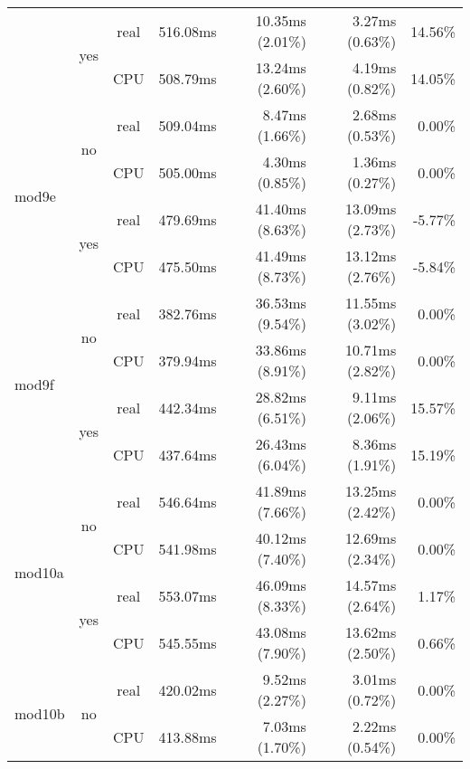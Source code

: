 \documentclass[en]{pracamgr}
\begin{document}
\begin{appendices}
\begin{small}
\begin{longtable}{|l|c|c|r|r|r|r|}
                          \cline{2-7}
                          & \multirow{2}{*}{yes} & real & 516.08ms & 10.35ms (2.01\%) & 3.27ms (0.63\%) & 14.56\% \\*
                          &                      & CPU  & 508.79ms & 13.24ms (2.60\%) & 4.19ms (0.82\%) & 14.05\% \\
\hline
\multirow{4}{*}{mod9e}    & \multirow{2}{*}{no}  & real & 509.04ms & 8.47ms (1.66\%) & 2.68ms (0.53\%) & 0.00\% \\*
                          &                      & CPU  & 505.00ms & 4.30ms (0.85\%) & 1.36ms (0.27\%) & 0.00\% \\*
                          \cline{2-7}
                          & \multirow{2}{*}{yes} & real & 479.69ms & 41.40ms (8.63\%) & 13.09ms (2.73\%) & -5.77\% \\*
                          &                      & CPU  & 475.50ms & 41.49ms (8.73\%) & 13.12ms (2.76\%) & -5.84\% \\
\hline
\multirow{4}{*}{mod9f}    & \multirow{2}{*}{no}  & real & 382.76ms & 36.53ms (9.54\%) & 11.55ms (3.02\%) & 0.00\% \\*
                          &                      & CPU  & 379.94ms & 33.86ms (8.91\%) & 10.71ms (2.82\%) & 0.00\% \\*
                          \cline{2-7}
                          & \multirow{2}{*}{yes} & real & 442.34ms & 28.82ms (6.51\%) & 9.11ms (2.06\%) & 15.57\% \\*
                          &                      & CPU  & 437.64ms & 26.43ms (6.04\%) & 8.36ms (1.91\%) & 15.19\% \\
\hline
\multirow{4}{*}{mod10a}   & \multirow{2}{*}{no}  & real & 546.64ms & 41.89ms (7.66\%) & 13.25ms (2.42\%) & 0.00\% \\*
                          &                      & CPU  & 541.98ms & 40.12ms (7.40\%) & 12.69ms (2.34\%) & 0.00\% \\*
                          \cline{2-7}
                          & \multirow{2}{*}{yes} & real & 553.07ms & 46.09ms (8.33\%) & 14.57ms (2.64\%) & 1.17\% \\*
                          &                      & CPU  & 545.55ms & 43.08ms (7.90\%) & 13.62ms (2.50\%) & 0.66\% \\
\hline
\multirow{4}{*}{mod10b}   & \multirow{2}{*}{no}  & real & 420.02ms & 9.52ms (2.27\%) & 3.01ms (0.72\%) & 0.00\% \\*
                          &                      & CPU  & 413.88ms & 7.03ms (1.70\%) & 2.22ms (0.54\%) & 0.00\% \\*

\end{longtable}
\end{small}
\end{appendices}
\end{document}
